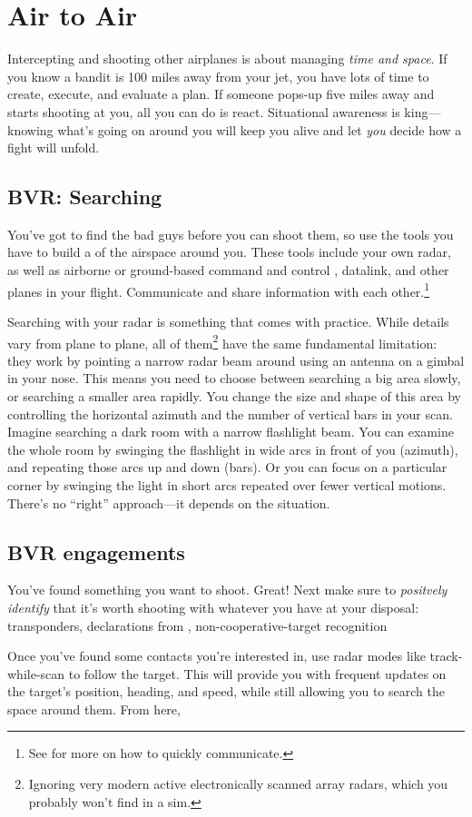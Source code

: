 \chapter{Air to Air}

Intercepting and shooting other airplanes is about managing \emph{time and space}.
If you know a bandit is 100 miles away from your jet,
you have lots of time to create, execute, and evaluate a plan.
If someone pops-up five miles away and starts shooting at you,
all you can do is react.
Situational awareness  is king---knowing what's going on around
you will keep you alive and let \emph{you} decide how a fight will unfold.

\section{BVR: Searching}

You've got to find the bad guys before you can shoot them,
so use the tools you have to build a  of the airspace
around you.
These tools include your own radar, as well as
airborne or ground-based command and control ,
datalink, and other planes in your flight.
Communicate and share information with each other.\punckern\footnote{See
 for more on how to quickly communicate.}

Searching with your radar is something that comes with practice.
While details vary from plane to plane,
all of them\footnote{Ignoring very modern active electronically scanned array
 radars, which you probably won't find in a sim.}
have the same fundamental limitation: they work by pointing a narrow radar beam
around using an antenna on a gimbal in your nose.
This means you need to choose between searching a big area slowly,
or searching a smaller area rapidly.
You change the size and shape of this area by controlling the horizontal azimuth
and the number of vertical bars in your scan.
Imagine searching a dark room with a narrow flashlight beam.
You can examine the whole room by swinging the flashlight in wide arcs
in front of you (azimuth), and repeating those arcs up and down (bars).
Or you can focus on a particular corner by swinging the light in short arcs
repeated over fewer vertical motions.
There's no ``right'' approach---it depends on the situation.

\section{BVR engagements}

You've found something you want to shoot. Great!
Next make sure to \emph{positvely identify}
that it's worth shooting with whatever you have at your disposal:
 transponders,
declarations from ,
non-cooperative-target recognition 

Once you've found some contacts you're interested in,
use radar modes like track-while-scan  to follow the target.
This will provide you with frequent updates on the target's position, heading,
and speed, while still allowing you to search the space around them.
From here, 
